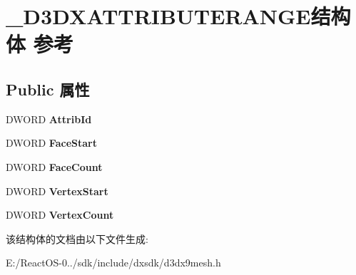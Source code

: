 \hypertarget{struct___d3_d_x_a_t_t_r_i_b_u_t_e_r_a_n_g_e}{}\section{\+\_\+\+D3\+D\+X\+A\+T\+T\+R\+I\+B\+U\+T\+E\+R\+A\+N\+G\+E结构体 参考}
\label{struct___d3_d_x_a_t_t_r_i_b_u_t_e_r_a_n_g_e}
\subsection*{Public 属性}
\begin{DoxyCompactItemize}
\item 
\mbox{\label{struct___d3_d_x_a_t_t_r_i_b_u_t_e_r_a_n_g_e_aa01ea92152fa7252e97a1f1e8f51c881}} 
D\+W\+O\+RD {\bfseries Attrib\+Id}
\item 
\mbox{\label{struct___d3_d_x_a_t_t_r_i_b_u_t_e_r_a_n_g_e_af78505944cab214986109a184de45e79}} 
D\+W\+O\+RD {\bfseries Face\+Start}
\item 
\mbox{\label{struct___d3_d_x_a_t_t_r_i_b_u_t_e_r_a_n_g_e_a1cd023560842076a32718feef5f184a7}} 
D\+W\+O\+RD {\bfseries Face\+Count}
\item 
\mbox{\label{struct___d3_d_x_a_t_t_r_i_b_u_t_e_r_a_n_g_e_a772b4746706d78c60ee180929c06eded}} 
D\+W\+O\+RD {\bfseries Vertex\+Start}
\item 
\mbox{\label{struct___d3_d_x_a_t_t_r_i_b_u_t_e_r_a_n_g_e_ad5c53cf9843bc3cf0fde28371bb3dedf}} 
D\+W\+O\+RD {\bfseries Vertex\+Count}
\end{DoxyCompactItemize}


该结构体的文档由以下文件生成\+:\begin{DoxyCompactItemize}
\item 
E\+:/\+React\+O\+S-\/0../sdk/include/dxsdk/d3dx9mesh.\+h\end{DoxyCompactItemize}
